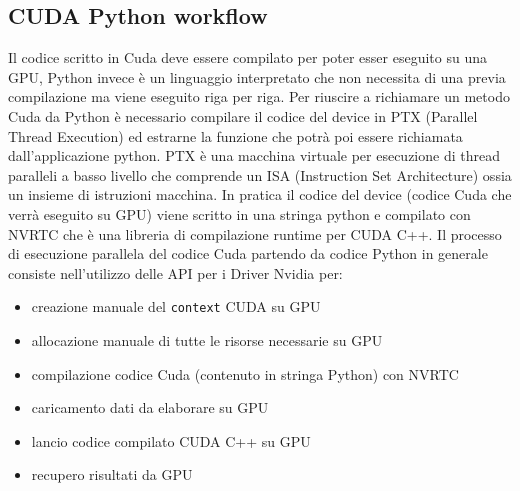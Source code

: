\documentclass[12pt,a4paper]{report}
\begin{document}
\subsection{CUDA Python workflow}
Il codice scritto in Cuda deve essere compilato per poter esser eseguito su una GPU, Python invece è un linguaggio interpretato che non necessita di una previa compilazione ma viene eseguito riga per riga. Per riuscire a richiamare un metodo Cuda da Python è necessario compilare il codice del device in PTX (Parallel Thread Execution) ed estrarne la funzione che potrà poi essere richiamata dall'applicazione python. PTX è una macchina virtuale per esecuzione di thread paralleli a basso livello che comprende un ISA (Instruction Set Architecture) ossia un insieme di istruzioni macchina. \newline
In pratica il codice del device (codice Cuda che verrà eseguito su GPU) viene scritto in una stringa python e compilato con NVRTC che è una libreria di compilazione runtime per CUDA C++. \newline
Il processo di esecuzione parallela del codice Cuda partendo da codice Python in generale consiste nell'utilizzo delle API per i Driver Nvidia per:
\begin{itemize}
    \item creazione manuale del \verb|context| CUDA su GPU
    \item allocazione manuale di tutte le risorse necessarie su GPU
    \item compilazione codice Cuda (contenuto in stringa Python) con NVRTC
        \begin{figure}[H]
        \centering
        \begin{floatrow}[1]
        \end{floatrow}
        \end{figure} 
    \item caricamento dati da elaborare su GPU
    \item lancio codice compilato CUDA C++ su GPU
    \item recupero risultati da GPU 
\end{itemize} \newpage
\end{document}
